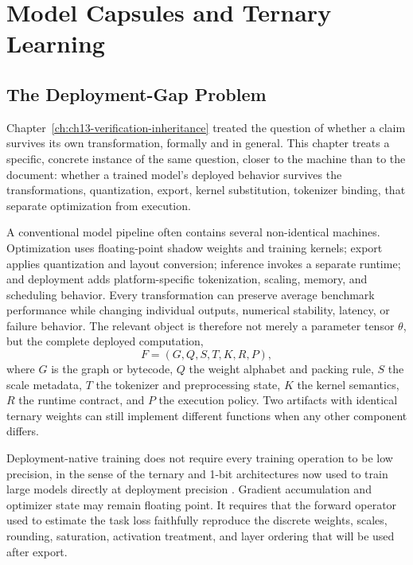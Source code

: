 
\chapter{Model Capsules and Ternary Learning}
\label{ch:ch14-model-capsules}
\section{The Deployment-Gap Problem}

Chapter~\ref{ch:ch13-verification-inheritance} treated the question of whether a claim survives its own transformation, formally and in general. This chapter treats a specific, concrete instance of the same question, closer to the machine than to the document: whether a trained model's deployed behavior survives the transformations, quantization, export, kernel substitution, tokenizer binding, that separate optimization from execution.

A conventional model pipeline often contains several non-identical machines. Optimization uses floating-point shadow weights and training kernels; export applies quantization and layout conversion; inference invokes a separate runtime; and deployment adds platform-specific tokenization, scaling, memory, and scheduling behavior. Every transformation can preserve average benchmark performance while changing individual outputs, numerical stability, latency, or failure behavior. The relevant object is therefore not merely a parameter tensor $\theta$, but the complete deployed computation,
\[
F = (G, Q, S, T, K, R, P),
\]
where $G$ is the graph or bytecode, $Q$ the weight alphabet and packing rule, $S$ the scale metadata, $T$ the tokenizer and preprocessing state, $K$ the kernel semantics, $R$ the runtime contract, and $P$ the execution policy. Two artifacts with identical ternary weights can still implement different functions when any other component differs.

Deployment-native training does not require every training operation to be low precision, in the sense of the ternary and 1-bit architectures now used to train large models directly at deployment precision \cite{wang2023,ma2024,bai2022,wang2025}. Gradient accumulation and optimizer state may remain floating point. It requires that the forward operator used to estimate the task loss faithfully reproduce the discrete weights, scales, rounding, saturation, activation treatment, and layer ordering that will be used after export.

